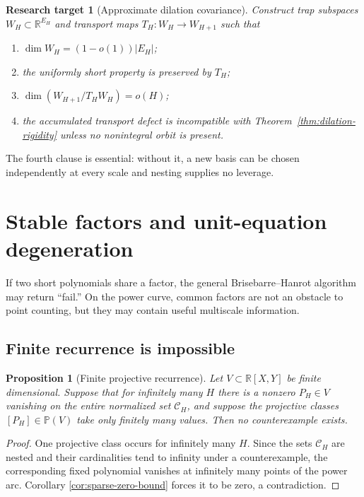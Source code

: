 \documentclass[11pt,oneside]{article}
\newtheorem{proposition}[theorem]{Proposition}
\newtheorem{target}[theorem]{Research target}
\theoremstyle{definition}
\theoremstyle{remark}
\newcommand{\R}{\mathbb R}
\newcommand{\cC}{\mathcal C}
\begin{document}
\begin{target}[Approximate dilation covariance]
\label{target:approx-covariance}
Construct trap subspaces $W_H\subset\R^{E_H}$ and transport maps
$T_H:W_H\to W_{H+1}$ such that
\begin{enumerate}
\item $\dim W_H=(1-o(1))|E_H|$;
\item the uniformly short property is preserved by $T_H$;
\item $\dim(W_{H+1}/T_HW_H)=o(H)$;
\item the accumulated transport defect is incompatible with
Theorem~\ref{thm:dilation-rigidity} unless no nonintegral orbit is present.
\end{enumerate}
\end{target}

The fourth clause is essential: without it, a new basis can be chosen independently at every
scale and nesting supplies no leverage.

\section{Stable factors and unit-equation degeneration}
\label{sec:stable-factors}

If two short polynomials share a factor, the general Brisebarre--Hanrot algorithm may return
``fail.''  On the power curve, common factors are not an obstacle to point counting, but they
may contain useful multiscale information.

\subsection{Finite recurrence is impossible}

\begin{proposition}[Finite projective recurrence]
\label{prop:finite-recurrence}
Let $V\subset\R[X,Y]$ be finite dimensional.  Suppose that for infinitely many $H$ there is a
nonzero $P_H\in V$ vanishing on the entire normalized set $\cC_H$, and suppose the projective
classes $[P_H]\in\mathbb P(V)$ take only finitely many values.  Then no counterexample exists.
\end{proposition}

\begin{proof}
One projective class occurs for infinitely many $H$.  Since the sets $\cC_H$ are nested and
their cardinalities tend to infinity under a counterexample, the corresponding fixed
polynomial vanishes at infinitely many points of the power arc.  Corollary
\ref{cor:sparse-zero-bound} forces it to be zero, a contradiction.
\end{proof}
\end{document}
